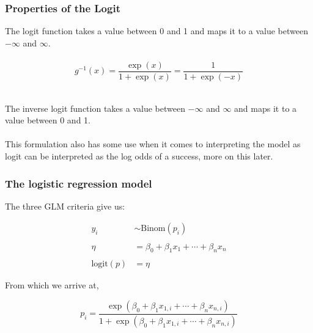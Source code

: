
\begin{frame}
\frametitle{Properties of the Logit}

The logit function takes a value between 0 and 1 and maps it to a value between $-\infty$ and $\infty$.\\
~\\

{
\[g^{-1}(x) = \frac{\exp(x)}{1+\exp(x)} = \frac{1}{1+\exp(-x)}\]
}

~\\
The inverse logit function takes a value between $-\infty$ and $\infty$ and maps it to a value between 0 and 1.\\

~\\
This formulation also has some use when it comes to interpreting the model as logit can be interpreted as the log odds of a success, more on this later.


\end{frame}


\begin{frame}
\frametitle{The logistic regression model}

The three GLM criteria give us:

\begin{align*}
y_i &\sim \text{Binom}(p_i)\\
\\
\eta &= \beta_0+\beta_1 x_1 + \cdots + \beta_n x_n\\
\\
\text{logit}(p) &= \eta
\end{align*}

From which we arrive at,

\[ p_i = \frac{\exp(\beta_0+\beta_1 x_{1,i} + \cdots + \beta_n x_{n,i})}{1+\exp(\beta_0+\beta_1 x_{1,i} + \cdots + \beta_n x_{n,i})} \]


\end{frame}


